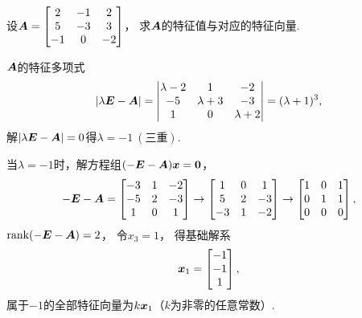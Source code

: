 \begin{example}
设\(\boldsymbol{A} = \begin{bmatrix} 2 & -1 & 2 \\ 5 & -3 & 3 \\ -1 & 0 & -2 \end{bmatrix}\)，
求\(\boldsymbol{A}\)的特征值与对应的特征向量.
\begin{solution}
\(\boldsymbol{A}\)的特征多项式\begin{equation*}
	\abs{\lambda\boldsymbol{E}-\boldsymbol{A}}
	= \begin{vmatrix}
		\lambda-2 & 1 & -2 \\
		-5 & \lambda+3 & -3 \\
		1 & 0 & \lambda+2
	\end{vmatrix}
	= (\lambda+1)^3,
\end{equation*}
解\(\abs{\lambda\boldsymbol{E}-\boldsymbol{A}}=0\)得\(\lambda=-1\ (\text{三重})\).

当\(\lambda=-1\)时，解方程组\((-\boldsymbol{E}-\boldsymbol{A})\boldsymbol{x}=\boldsymbol0\)，\begin{equation*}
	-\boldsymbol{E}-\boldsymbol{A} = \begin{bmatrix} -3 & 1 & -2 \\ -5 & 2 & -3 \\ 1 & 0 & 1 \end{bmatrix}
	\to \begin{bmatrix} 1 & 0 & 1 \\ 5 & 2 & -3 \\ -3 & 1 & -2 \end{bmatrix}
	\to \begin{bmatrix} 1 & 0 & 1 \\ 0 & 1 & 1 \\ 0 & 0 & 0 \end{bmatrix},
\end{equation*}
\(\rank(-\boldsymbol{E}-\boldsymbol{A})=2\)，
令\(x_3=1\)，
得基础解系\begin{equation*}
	\boldsymbol{x}_1=\begin{bmatrix} -1 \\ -1 \\ 1 \end{bmatrix},
\end{equation*}
属于\(-1\)的全部特征向量为\(k\boldsymbol{x}_1\)（\(k\)为非零的任意常数）.
\end{solution}
\end{example}

